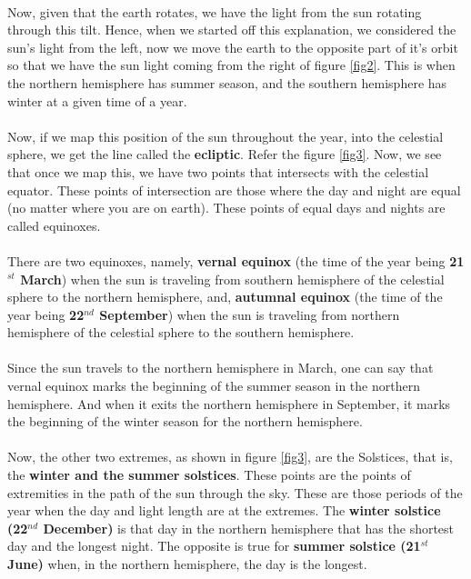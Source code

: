 \documentclass[a4paper,twoside]{article}
\numberwithin{equation}{section}
\begin{document}
\paragraph{}
Now, given that the earth rotates, we have the light from the sun rotating through this tilt. Hence, when we started off this explanation, we considered the sun's light from the left, now we move the earth to the opposite part of it's orbit so that we have the sun light coming from the right of figure \ref{fig2}. This is when the northern hemisphere has summer season, and the southern hemisphere has winter at a given time of a year.
\paragraph{}
Now, if we map this position of the sun throughout the year, into the celestial sphere, we get the line called the \textbf{ecliptic}. Refer the figure \ref{fig3}. Now, we see that once we map this, we have two points that intersects with the celestial equator. These points of intersection are those where the day and night are equal (no matter where you are on earth). These points of equal days and nights are called equinoxes. 
\newpage
\clearpage
\paragraph{}
There are two equinoxes, namely, \textbf{vernal equinox} (the time of the year being \textbf{21$^{st}$ March}) when the sun is traveling from southern hemisphere of the celestial sphere to the northern hemisphere, and, \textbf{autumnal equinox} (the time of the year being \textbf{22$^{nd}$ September}) when the sun is traveling from northern hemisphere of the celestial sphere to the southern hemisphere. 
\paragraph{}
Since the sun travels to the northern hemisphere in March, one can say that vernal equinox marks the beginning of the summer season in the northern hemisphere. And when it exits the northern hemisphere in September, it marks the beginning of the winter season for the northern hemisphere.
\paragraph{}
Now, the other two extremes, as shown in figure \ref{fig3}, are the Solstices, that is, the \textbf{winter and the summer solstices}. These points are the points of extremities in the path of the sun through the sky. These are those periods of the year when the day and light length are at the extremes. The \textbf{winter solstice (22$^{nd}$ December)} is that day in the northern hemisphere that has the shortest day and the longest night. The opposite is true for \textbf{summer solstice (21$^{st}$ June)} when, in the northern hemisphere, the day is the longest. 
\end{document}
